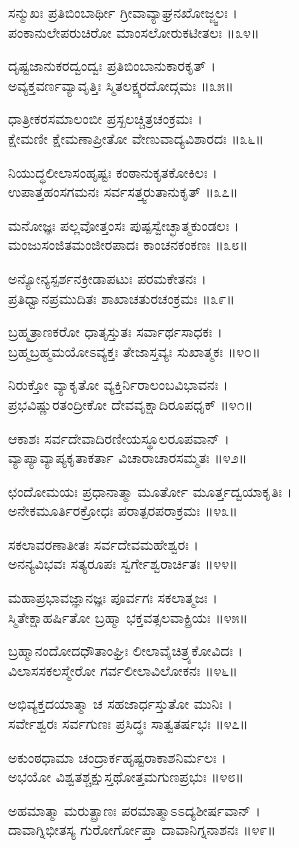 ಸನ್ಮುಖಃ ಪ್ರತಿಬಿಂಬಾರ್ಥೀ ಗ್ರೀವಾವ್ಯಾಘ್ರನಖೋಜ್ಜ್ವಲಃ ।\\
ಪಂಕಾನುಲೇಪರುಚಿರೋ ಮಾಂಸಲೋರುಕಟೀತಲಃ ॥೩೪॥

ದೃಷ್ಟಜಾನುಕರದ್ವಂದ್ವಃ ಪ್ರತಿಬಿಂಬಾನುಕಾರಕೃತ್ ।\\
ಅವ್ಯಕ್ತವರ್ಣವ್ಯಾವೃತ್ತಿಃ ಸ್ಮಿತಲಕ್ಷ್ಯರದೋದ್ಗಮಃ ॥೩೫॥

ಧಾತ್ರೀಕರಸಮಾಲಂಬೀ ಪ್ರಸ್ಖಲಚ್ಚಿತ್ರಚಂಕ್ರಮಃ ।\\
ಕ್ಷೇಮಣೀ ಕ್ಷೇಮಣಾಪ್ರೀತೋ ವೇಣುವಾದ್ಯವಿಶಾರದಃ ॥೩೬॥

ನಿಯುದ್ಧಲೀಲಾಸಂಹೃಷ್ಟಃ ಕಂಠಾನುಕೃತಕೋಕಿಲಃ ।\\
ಉಪಾತ್ತಹಂಸಗಮನಃ ಸರ್ವಸತ್ತ್ವರುತಾನುಕೃತ್ ॥೩೭॥

ಮನೋಜ್ಞಃ ಪಲ್ಲವೋತ್ತಂಸಃ ಪುಷ್ಪಸ್ವೇಚ್ಛಾತ್ಮಕುಂಡಲಃ ।\\
ಮಂಜುಸಂಜಿತಮಂಜೀರಪಾದಃ ಕಾಂಚನಕಂಕಣಃ ॥೩೮॥

ಅನ್ಯೋನ್ಯಸ್ಪರ್ಶನಕ್ರೀಡಾಪಟುಃ ಪರಮಕೇತನಃ ।\\
ಪ್ರತಿಧ್ವಾನಪ್ರಮುದಿತಃ ಶಾಖಾಚತುರಚಂಕ್ರಮಃ ॥೩೯॥

ಬ್ರಹ್ಮತ್ರಾಣಕರೋ ಧಾತೃಸ್ತುತಃ ಸರ್ವಾರ್ಥಸಾಧಕಃ ।\\
ಬ್ರಹ್ಮಬ್ರಹ್ಮಮಯೋಽವ್ಯಕ್ತಃ ತೇಜಾಸ್ತವ್ಯಃ ಸುಖಾತ್ಮಕಃ ॥೪೦॥

ನಿರುಕ್ತೋ ವ್ಯಾಕೃತೋ ವ್ಯಕ್ತಿರ್ನಿರಾಲಂಬವಿಭಾವನಃ ।\\
ಪ್ರಭವಿಷ್ಣುರತಂದ್ರೀಕೋ ದೇವವೃಕ್ಷಾದಿರೂಪಧೃಕ್ ॥೪೧॥

ಆಕಾಶಃ ಸರ್ವದೇವಾದಿರಣೀಯಸ್ಥೂಲರೂಪವಾನ್ ।\\
ವ್ಯಾಪ್ಯಾವ್ಯಾಪ್ಯಕೃತಾಕರ್ತಾ ವಿಚಾರಾಚಾರಸಮ್ಮತಃ ॥೪೨॥

ಛಂದೋಮಯಃ ಪ್ರಧಾನಾತ್ಮಾ ಮೂರ್ತೋ ಮೂರ್ತ್ತದ್ವಯಾಕೃತಿಃ ।\\
ಅನೇಕಮೂರ್ತಿರಕ್ರೋಧಃ ಪರಾತ್ಪರಪರಾಕ್ರಮಃ ॥೪೩॥

ಸಕಲಾವರಣಾತೀತಃ ಸರ್ವದೇವಮಹೇಶ್ವರಃ ।\\
ಅನನ್ಯವಿಭವಃ ಸತ್ಯರೂಪಃ ಸ್ವರ್ಗೇಶ್ವರಾರ್ಚಿತಃ ॥೪೪॥

ಮಹಾಪ್ರಭಾವಜ್ಞಾನಜ್ಞಃ ಪೂರ್ವಗಃ ಸಕಲಾತ್ಮಜಃ ।\\
ಸ್ಮಿತೇಕ್ಷಾಹರ್ಷಿತೋ ಬ್ರಹ್ಮಾ ಭಕ್ತವತ್ಸಲವಾಕ್ಪ್ರಿಯಃ ॥೪೫॥

ಬ್ರಹ್ಮಾನಂದೋದಧೌತಾಂಘ್ರಿಃ ಲೀಲಾವೈಚಿತ್ರ್ಯಕೋವಿದಃ ।\\
ವಿಲಾಸಸಕಲಸ್ಮೇರೋ ಗರ್ವಲೀಲಾವಿಲೋಕನಃ ॥೪೬॥

ಅಭಿವ್ಯಕ್ತದಯಾತ್ಮಾ ಚ ಸಹಜಾರ್ಧಸ್ತುತೋ ಮುನಿಃ ।\\
ಸರ್ವೇಶ್ವರಃ ಸರ್ವಗುಣಃ ಪ್ರಸಿದ್ಧಃ ಸಾತ್ವತರ್ಷಭಃ ॥೪೭॥

ಅಕುಂಠಧಾಮಾ ಚಂದ್ರಾರ್ಕಹೃಷ್ಟರಾಕಾಶನಿರ್ಮಲಃ ।\\
ಅಭಯೋ ವಿಶ್ವತಶ್ಚಕ್ಷುಸ್ತಥೋತ್ತಮಗುಣಪ್ರಭುಃ ॥೪೮॥

ಅಹಮಾತ್ಮಾ ಮರುತ್ಪ್ರಾಣಃ ಪರಮಾತ್ಮಾಽಽದ್ಯಶೀರ್ಷವಾನ್ ।\\
ದಾವಾಗ್ನಿಭೀತಸ್ಯ ಗುರೋರ್ಗೋಪ್ತಾ ದಾವಾನಿಗ್ನನಾಶನಃ ॥೪೯॥

